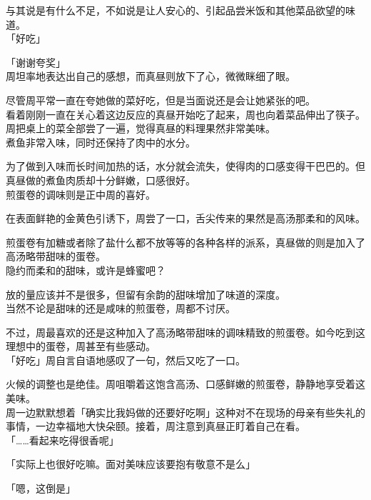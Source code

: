 与其说是有什么不足，不如说是让人安心的、引起品尝米饭和其他菜品欲望的味道。\\

「好吃」

「谢谢夸奖」\\

周坦率地表达出自己的感想，而真昼则放下了心，微微眯细了眼。

尽管周平常一直在夸她做的菜好吃，但是当面说还是会让她紧张的吧。\\

看着刚刚一直在关心着这边反应的真昼开始吃了起来，周也向着菜品伸出了筷子。\\

周把桌上的菜全部尝了一遍，觉得真昼的料理果然非常美味。\\

煮鱼非常入味，同时还保持了肉中的水分。

为了做到入味而长时间加热的话，水分就会流失，使得肉的口感变得干巴巴的。但真昼做的煮鱼肉质却十分鲜嫩，口感很好。\\

煎蛋卷的调味则是正中周的喜好。

在表面鲜艳的金黄色引诱下，周尝了一口，舌尖传来的果然是高汤那柔和的风味。

煎蛋卷有加糖或者除了盐什么都不放等等的各种各样的派系，真昼做的则是加入了高汤略带甜味的蛋卷。\\

隐约而柔和的甜味，或许是蜂蜜吧？

放的量应该并不是很多，但留有余韵的甜味增加了味道的深度。\\

当然不论是甜味的还是咸味的煎蛋卷，周都不讨厌。

不过，周最喜欢的还是这种加入了高汤略带甜味的调味精致的煎蛋卷。如今吃到这理想中的蛋卷，周甚至有些感动。\\

「好吃」周自言自语地感叹了一句，然后又吃了一口。

火候的调整也是绝佳。周咀嚼着这饱含高汤、口感鲜嫩的煎蛋卷，静静地享受着这美味。\\

周一边默默想着「确实比我妈做的还要好吃啊」这种对不在现场的母亲有些失礼的事情，一边幸福地大快朵颐。接着，周注意到真昼正盯着自己在看。\\

「……看起来吃得很香呢」

「实际上也很好吃嘛。面对美味应该要抱有敬意不是么」

「嗯，这倒是」

